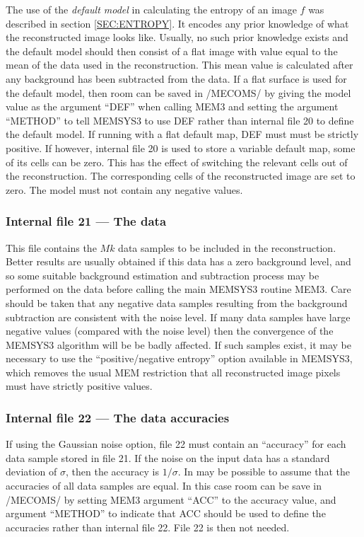 The use of the {\em default model} in calculating the entropy of an image $f$
was described in section \ref {SEC:ENTROPY}. It encodes any prior knowledge of
what the reconstructed image looks like. Usually, no such prior  knowledge
exists and the default model should then consist of a flat image with value
equal to the mean of the data used in the reconstruction. This mean value is
calculated after any background has been subtracted from  the data. If a flat
surface is used for the default model, then room can be  saved in /MECOMS/ by
giving the model value as the argument ``DEF'' when calling  MEM3 and setting
the argument ``METHOD'' to tell MEMSYS3 to use DEF rather than  internal file
20 to define the default model. If running with a flat default map, DEF must
must be strictly positive. If however, internal file 20 is used to store a
variable default map, some of its cells can be zero. This has the  effect of
switching the relevant cells out of the reconstruction. The corresponding cells
of the reconstructed image are set to zero. The model must not contain any
negative values.

\subsubsection {Internal file 21 --- The data}

This file contains the $Mk$ data samples to be included in the reconstruction.
Better results are usually obtained if this data has a zero background level,
and so some suitable background estimation and subtraction process may be 
performed on the data before calling the main MEMSYS3 routine MEM3. Care should
be taken that any negative data samples resulting from the background 
subtraction are consistent with the noise level. If many data samples have
large  negative values (compared with the noise level) then the convergence of 
the MEMSYS3 algorithm will be be badly affected. If such samples exist, it may 
be necessary to use the ``positive/negative entropy'' option available in 
MEMSYS3, which removes the usual MEM restriction that all reconstructed image 
pixels must have strictly positive values.

\subsubsection {Internal file 22 --- The data accuracies}

If using the Gaussian noise option, file 22 must contain an ``accuracy'' for
each data sample stored in file 21. If the noise on the input data has a
standard  deviation of $\sigma$, then the accuracy is $1/\sigma$. In may be
possible to assume that the accuracies of all data samples are equal.  In this
case room can be save in /MECOMS/ by setting MEM3 argument ``ACC'' to  the
accuracy value, and argument ``METHOD'' to indicate that ACC should be used  to
define the accuracies rather than internal file 22. File 22 is then not 
needed. 

